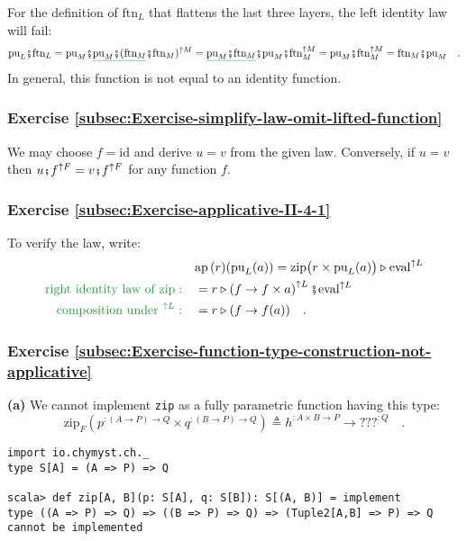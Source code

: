 For the definition of $\text{ftn}_{L}$ that flattens the last three
layers, the left identity law will fail:
\[
\text{pu}_{L}\bef\text{ftn}_{L}=\text{pu}_{M}\bef\gunderline{\text{pu}_{M}\bef(\text{ftn}_{M}}\bef\text{ftn}_{M})^{\uparrow M}=\gunderline{\text{pu}_{M}\bef\text{ftn}_{M}}\bef\text{pu}_{M}\bef\text{ftn}_{M}^{\uparrow M}=\text{pu}_{M}\bef\text{ftn}_{M}^{\uparrow M}=\text{ftn}_{M}\bef\text{pu}_{M}\quad.
\]
In general, this function is not equal to an identity function.


\subsubsection*{Exercise \ref{subsec:Exercise-simplify-law-omit-lifted-function}}

We may choose $f=\text{id}$ and derive $u=v$ from the given law.
Conversely, if $u=v$ then $u\bef f^{\uparrow F}=v\bef f^{\uparrow F}$
for any function $f$.

\subsubsection*{Exercise \ref{subsec:Exercise-applicative-II-4-1}}

To verify the law, write:
\begin{align*}
 & \text{ap}\,(r)(\text{pu}_{L}(a))=\text{zip}\big(r\times\text{pu}_{L}(a)\big)\triangleright\text{eval}^{\uparrow L}\\
{\color{greenunder}\text{right identity law of }\text{zip}:}\quad & =r\triangleright\left(f\rightarrow f\times a\right)^{\uparrow L}\bef\text{eval}^{\uparrow L}\\
{\color{greenunder}\text{composition under }^{\uparrow L}:}\quad & =r\triangleright(f\rightarrow f(a))\quad.
\end{align*}


\subsubsection*{Exercise \ref{subsec:Exercise-function-type-construction-not-applicative}}

\textbf{(a)} We cannot implement \lstinline!zip! as a fully parametric
function having this type:
\[
\text{zip}_{F}(p^{:(A\rightarrow P)\rightarrow Q}\times q^{:(B\rightarrow P)\rightarrow Q})\triangleq h^{:A\times B\rightarrow P}\rightarrow\text{???}^{:Q}\quad.
\]
\begin{lstlisting}
import io.chymyst.ch._
type S[A] = (A => P) => Q

scala> def zip[A, B](p: S[A], q: S[B]): S[(A, B)] = implement
type ((A => P) => Q) => ((B => P) => Q) => (Tuple2[A,B] => P) => Q cannot be implemented
\end{lstlisting}

